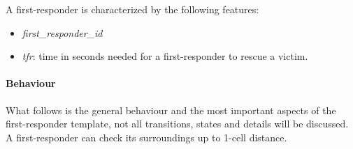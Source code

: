 \noindent
A first-responder is characterized by the following features:
\begin{itemize}
	\item \textit{first\_responder\_id}
	\item \textit{tfr}: time in seconds needed for a first-responder to rescue a victim.
\end{itemize}

\paragraph{Behaviour}
What follows is the general behaviour and the most important aspects of the first-responder template, not all transitions, states and details will be discussed.\newline
A first-responder can check its surroundings up to 1-cell distance.

